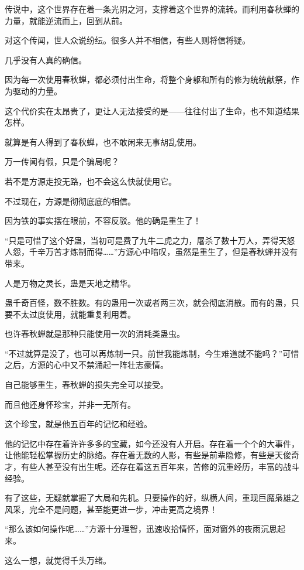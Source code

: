 
\begin{this_body}

传说中，这个世界存在着一条光阴之河，支撑着这个世界的流转。而利用春秋蝉的力量，就能逆流而上，回到从前。

对这个传闻，世人众说纷纭。很多人并不相信，有些人则将信将疑。

几乎没有人真的确信。

因为每一次使用春秋蝉，都必须付出生命，将整个身躯和所有的修为统统献祭，作为驱动的力量。

这个代价实在太昂贵了，更让人无法接受的是——往往付出了生命，也不知道结果怎样。

就算是有人得到了春秋蝉，也不敢闲来无事胡乱使用。

万一传闻有假，只是个骗局呢？

若不是方源走投无路，也不会这么快就使用它。

不过现在，方源是彻彻底底的相信。

因为铁的事实摆在眼前，不容反驳。他的确是重生了！

“只是可惜了这个好蛊，当初可是费了九牛二虎之力，屠杀了数十万人，弄得天怒人怨，千辛万苦才炼制而得……”方源心中暗叹，虽然是重生了，但是春秋蝉并没有带来。

人是万物之灵长，蛊是天地之精华。

蛊千奇百怪，数不胜数。有的蛊用一次或者两三次，就会彻底消散。而有的蛊，只要不太过度使用，就能重复利用着。

也许春秋蝉就是那种只能使用一次的消耗类蛊虫。

“不过就算是没了，也可以再炼制一只。前世我能炼制，今生难道就不能吗？”可惜之后，方源的心中又不禁涌起一阵壮志豪情。

自己能够重生，春秋蝉的损失完全可以接受。

而且他还身怀珍宝，并非一无所有。

这个珍宝，就是他五百年的记忆和经验。

他的记忆中存在着许许多多的宝藏，如今还没有人开启。存在着一个个的大事件，让他能轻松掌握历史的脉络。存在着无数的人影，有些是前辈隐修，有些是天俊奇才，有些人甚至没有出生呢。还存在着这五百年来，苦修的沉重经历，丰富的战斗经验。

有了这些，无疑就掌握了大局和先机。只要操作的好，纵横人间，重现巨魔枭雄之风采，完全不是问题，甚至能更进一步，冲击更高之境界！

“那么该如何操作呢……”方源十分理智，迅速收拾情怀，面对窗外的夜雨沉思起来。

这么一想，就觉得千头万绪。


\end{this_body}
